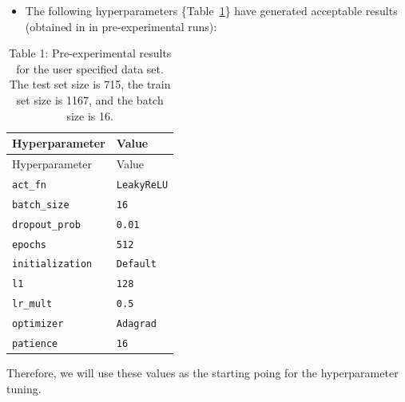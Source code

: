 \documentclass[
  letterpaper,
  DIV=11,
  numbers=noendperiod]{scrreprt}
\providecommand{\tightlist}{%
  \setlength{\itemsep}{0pt}\setlength{\parskip}{0pt}}\usepackage{longtable,booktabs,array}
\begin{document}
\begin{tcolorbox}[enhanced jigsaw, rightrule=.15mm, coltitle=black, title=\textcolor{quarto-callout-note-color}{\faInfo}\hspace{0.5em}{Note: Pre-experimental Results}, opacitybacktitle=0.6, bottomrule=.15mm, opacityback=0, left=2mm, colback=white, leftrule=.75mm, colframe=quarto-callout-note-color-frame, colbacktitle=quarto-callout-note-color!10!white, toprule=.15mm, toptitle=1mm, bottomtitle=1mm, titlerule=0mm, breakable, arc=.35mm]

\begin{itemize}
\tightlist
\item
  The following hyperparameters
  \{Table~\ref{tbl-pre-experimental-results-33}\} have generated
  acceptable results (obtained in in pre-experimental runs):
\end{itemize}

\begin{longtable}[]{@{}ll@{}}
\caption{Table 1: Pre-experimental results for the user specified data
set. The test set size is 715, the train set size is 1167, and the batch
size is 16.}\label{tbl-pre-experimental-results-33}\tabularnewline
\toprule\noalign{}
Hyperparameter & Value \\
\midrule\noalign{}
\endfirsthead
\toprule\noalign{}
Hyperparameter & Value \\
\midrule\noalign{}
\endhead
\bottomrule\noalign{}
\endlastfoot
\texttt{act\_fn} & \texttt{LeakyReLU} \\
\texttt{batch\_size} & \texttt{16} \\
\texttt{dropout\_prob} & \texttt{0.01} \\
\texttt{epochs} & \texttt{512} \\
\texttt{initialization} & \texttt{Default} \\
\texttt{l1} & \texttt{128} \\
\texttt{lr\_mult} & \texttt{0.5} \\
\texttt{optimizer} & \texttt{Adagrad} \\
\texttt{patience} & \texttt{16} \\
\end{longtable}

Therefore, we will use these values as the starting poing for the
hyperparameter tuning.

\end{tcolorbox}
\end{document}
